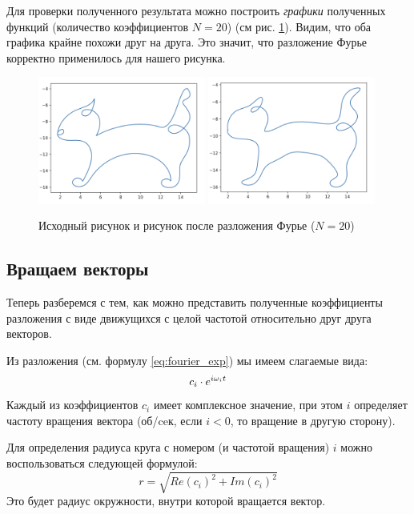 Для проверки полученного результата можно построить \textit{графики} полученных функций (количество коэффициентов $N=20$) (см рис. \ref{fig:cat_plot}). 
Видим, что оба графика крайне похожи друг на друга. Это значит, что разложение Фурье корректно применилось для нашего рисунка. 

\begin{figure}[ht!]
    \centering
    \includegraphics[width=0.49\textwidth]{./media/cat_func.png}
    \includegraphics[width=0.49\textwidth]{./media/cat_fourier.png}
    \caption[]{Исходный рисунок и рисунок после разложения Фурье ($N = 20$)}
    \label{fig:cat_plot}
\end{figure}

\subsection{Вращаем векторы}
Теперь разберемся с тем, как можно представить полученные коэффициенты разложения с виде движущихся с целой частотой относительно друг друга векторов. 

Из разложения (см. формулу \ref{eq:fourier_exp}) мы имеем слагаемые вида:
\begin{equation}
    c_i\cdot e^{i\omega_it}
    \notag
\end{equation}
Каждый из коэффициентов $c_i$ имеет комплексное значение, при этом $i$ определяет частоту вращения вектора (об/ceк, если $i < 0$, то вращение в другую сторону).

Для определения радиуса круга с номером (и частотой вращения) $i$ можно воспользоваться следующей формулой: 
\begin{equation}
    r = \sqrt{Re(c_i)^2 + Im(c_i)^2}
\end{equation}
Это будет радиус окружности, внутри которой вращается вектор. 

